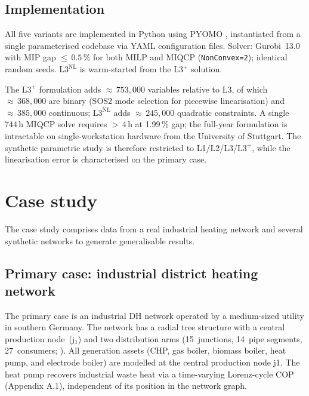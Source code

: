 \documentclass[a4paper,fleqn]{cas-dc}
\newcommand{\Lplus}{\mathrm{L3}^{+}}
\newcommand{\Lnl}{\mathrm{L3}^{\mathrm{NL}}}
\begin{document}
\subsection{Implementation}
\label{sec:model_impl}

All five variants are implemented in Python using PYOMO 
\cite{pyomo}, instantiated from a single parameterised codebase
via YAML configuration files. Solver: Gurobi~13.0 with MIP gap
${\leq}\,0.5\,\%$ for both MILP and MIQCP
(\texttt{NonConvex=2}); identical random seeds. $\Lnl$ is
warm-started from the $\Lplus$ solution.

The $\Lplus$ formulation adds ${\approx}\,753{,}000$ variables
relative to L3, of which ${\approx}\,368{,}000$ are binary
(SOS2 mode selection for piecewise linearisation) and
${\approx}\,385{,}000$ continuous; $\Lnl$ adds
${\approx}\,245{,}000$ quadratic constraints. A single
744\,h MIQCP solve requires ${>}\,4$\,h at 1.99\,\% gap; the
full-year formulation is intractable on single-workstation hardware from the 
University of Stuttgart. The synthetic parametric study is therefore restricted
to L1/L2/L3/$\Lplus$, while the linearisation error is
characterised on the primary case.

\section{Case study}
\label{sec:case_studies}
The case study comprises data from a real industrial heating network and several synthetic networks to generate generalisable results.

\subsection{Primary case: industrial district heating network}
\label{sec:case_stadtbach}

The primary case is an industrial DH network operated by a
medium-sized utility in southern Germany. The network has a radial
tree structure with a central production node~(j$_1$) and two
distribution arms (15~junctions, 14~pipe segments, 27~consumers;
). All generation assets (CHP, gas boiler, biomass boiler, heat pump, and electrode boiler) are modelled at the central production node j1. The heat pump recovers industrial waste heat via a time-varying Lorenz-cycle COP (Appendix A.1), independent of its position in the network graph.
\end{document}
